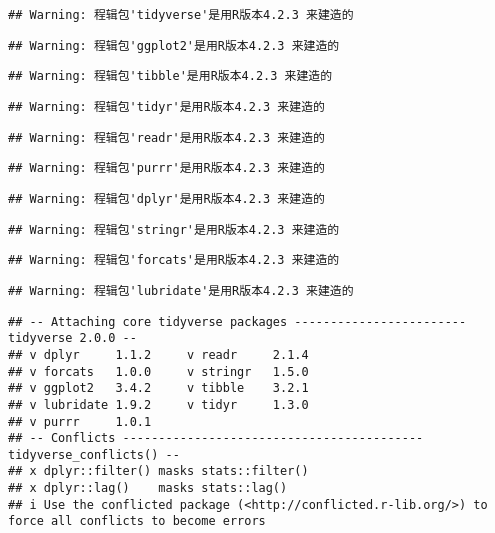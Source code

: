 \documentclass[
]{article}
\begin{document}
\begin{verbatim}
## Warning: 程辑包'tidyverse'是用R版本4.2.3 来建造的
\end{verbatim}

\begin{verbatim}
## Warning: 程辑包'ggplot2'是用R版本4.2.3 来建造的
\end{verbatim}

\begin{verbatim}
## Warning: 程辑包'tibble'是用R版本4.2.3 来建造的
\end{verbatim}

\begin{verbatim}
## Warning: 程辑包'tidyr'是用R版本4.2.3 来建造的
\end{verbatim}

\begin{verbatim}
## Warning: 程辑包'readr'是用R版本4.2.3 来建造的
\end{verbatim}

\begin{verbatim}
## Warning: 程辑包'purrr'是用R版本4.2.3 来建造的
\end{verbatim}

\begin{verbatim}
## Warning: 程辑包'dplyr'是用R版本4.2.3 来建造的
\end{verbatim}

\begin{verbatim}
## Warning: 程辑包'stringr'是用R版本4.2.3 来建造的
\end{verbatim}

\begin{verbatim}
## Warning: 程辑包'forcats'是用R版本4.2.3 来建造的
\end{verbatim}

\begin{verbatim}
## Warning: 程辑包'lubridate'是用R版本4.2.3 来建造的
\end{verbatim}

\begin{verbatim}
## -- Attaching core tidyverse packages ------------------------ tidyverse 2.0.0 --
## v dplyr     1.1.2     v readr     2.1.4
## v forcats   1.0.0     v stringr   1.5.0
## v ggplot2   3.4.2     v tibble    3.2.1
## v lubridate 1.9.2     v tidyr     1.3.0
## v purrr     1.0.1     
## -- Conflicts ------------------------------------------ tidyverse_conflicts() --
## x dplyr::filter() masks stats::filter()
## x dplyr::lag()    masks stats::lag()
## i Use the conflicted package (<http://conflicted.r-lib.org/>) to force all conflicts to become errors
\end{verbatim}
\end{document}

